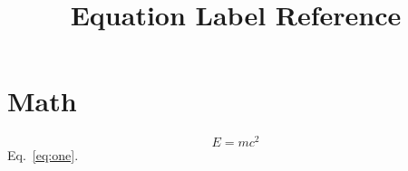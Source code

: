 \documentclass{article}
\begin{document}
\title{Equation Label Reference}\maketitle
\section{Math}\begin{equation}E=mc^2\label{eq:one}\end{equation} Eq.~\ref{eq:one}.
\end{document}
